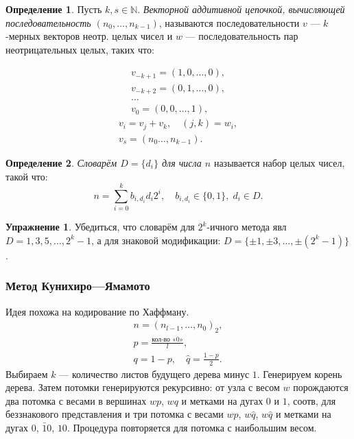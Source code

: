 \documentclass[12pt]{article}%
\newcommand{\N}{\ensuremath{\mathbb N}}
\theoremstyle{remark}
\theoremstyle{definition}
\newtheorem{Exec}{Упражнение}
\newtheorem{Def}{Определение}[section]
\begin{document}
\begin{Def}
Пусть $k, s \in \N$. \emph{Векторной аддитивной цепочкой, вычисляющей
последовательность $(n_0, \ldots, n_{k-1})$}, называются последовательности $v$
— $k$-мерных векторов неотр. целых чисел и $w$ — последовательность пар
неотрицательных целых, таких что:
\begin{multicols}{2}
\begin{gather*}
v_{-k+1} = (1, 0, \ldots ,0),\\
v_{-k+2} = (0, 1, \ldots ,0),\\
\ldots \\
v_{0} = (0, 0, \ldots ,1),
\end{gather*}
\columnbreak
\begin{gather*}
v_{i} = v_j + v_k, \quad (j, k) = w_i,\\
v_{s} = (n_0 \ldots ,n_{k-1}).
\end{gather*}
\end{multicols}
\end{Def}

\begin{Def}\emph{Словарём $D=\{d_i\}$ для числа $n$} называется набор целых
чисел, такой что:
$$n = \sum_{i=0}^k b_{i, d_i} d_i 2^i, \quad b_{i, d_i}\in\{0,1\},\; d_i \in
D.$$
\end{Def}

\begin{Exec}Убедиться, что словарём для $2^k$-ичного метода явл $D = 1, 3, 5,
\ldots, 2^k - 1$, а для знаковой модификации:
$D = \{ \pm 1,\pm 3, \ldots, \pm(2^k - 1) \}$.
\end{Exec}

\subsubsection{Метод Кунихиро—Ямамото}
Идея похожа на кодирование по Хаффману.
\begin{gather*}
n = (n_{l-1}, \ldots , n_0)_2,\\
p = \frac {\text{кол-во «0»}} {l},\\
q = 1 - p, \quad \hat{q} = \frac{1 - p}{2}.
\end{gather*}
Выбираем $k$ — количество листов будущего дерева минус $1$. Генерируем корень
дерева. Затем потомки генерируются рекурсивно: от узла с весом $w$ порождаются
два потомка с весами в вершинах $wp$, $wq$ и метками на дугах $0$ и $1$, соотв, для
беззнакового представления и три потомка с весами $wp$, $w\hat{q}$, $w\hat{q}$ и
метками на дугах $0$, $\bar{1}0$, $10$. Процедура повторяется для потомка с
наибольшим весом.
\end{document}
